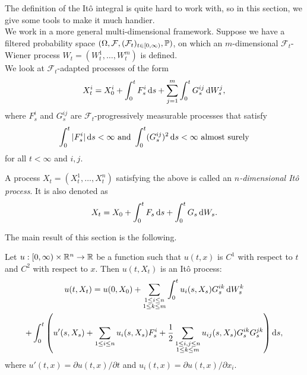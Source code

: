 The definition of the It\^{o} integral is quite hard to work with, so in this section, we give some tools to make it much handier.\\
We work in a more general multi-dimensional framework. Suppose we have a filtered probability space $(\Omega,\mathcal{F},(\mathcal{F}_t)_{t\in[0,\infty)},\mathbb{P})$, on which an $m$-dimensional $\mathcal{F}_t$-Wiener process $W_t = (W_t^1,\ldots,W_t^m)$ is defined.\\
We look at $\mathcal{F}_t$-adapted processes of the form
\[ X_t^i = X_0^i + \int_0^t F_s^i \operatorname{d}\!{s} + \sum_{j=1}^m \int_0^t G_s^{ij} \operatorname{d}\!{W}_s^j, \]
where $F_s^i$ and $G_s^{ij}$ are $\mathcal{F}_t$-progressively measurable processes that satisfy
\[ \int_0^t |F_s^i| \operatorname{d}\!{s} < \infty \text{ and } \int_0^t (G_s^{ij})^2\operatorname{d}\!{s} < \infty \text{ almost surely} \]
for all $t<\infty$ and $i,j$.

\begin{fdef}[It\^{o} Process]
	A process $X_t = (X_t^1,\ldots,X_t^n)$ satisfying the above is called an \textit{$n$-dimensional It\^{o} process}. It is also denoted as
	\begin{equation}
		\label{eqn: ito process}
		X_t = X_0 + \int_0^t F_s\operatorname{d}\!{s} + \int_0^t G_s\operatorname{d}\!{W}_s.
	\end{equation}
\end{fdef}

The main result of this section is the following.

\begin{ftheo}[It\^{o} Rule]
	Let $u:[0,\infty)\times\mathbb{R}^n\to\mathbb{R}$ be a function such that $u(t,x)$ is $C^1$ with respect to $t$ and $C^2$ with respect to $x$. Then $u(t,X_t)$ is an It\^{o} process:
	\begin{multline}
		\label{eqn: ito rule}
		u(t,X_t) = u(0,X_0) + \sum_{\substack{1\leq i\leq n \\ 1\leq k\leq m}} \int_0^t u_i(s,X_s)G_s^{ik}\operatorname{d}\!{W}_s^k \\ + \int_0^t \left(u'(s,X_s) + \sum_{1\leq i\leq n} u_i(s,X_s)F_s^i + \frac{1}{2} \sum_{\substack{1\leq i,j\leq n \\ 1\leq k\leq m}} u_{ij}(s,X_s)G_s^{ik}G_s^{jk}\right)\operatorname{d}\!{s},
	\end{multline}
	where $u'(t,x) = \partial u(t,x)/\partial t$ and $u_i(t,x) = \partial u(t,x) / \partial x_i$.
\end{ftheo}

